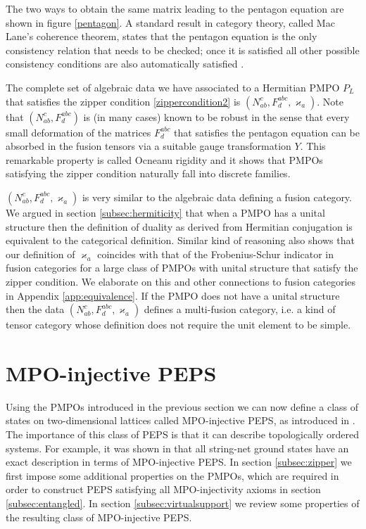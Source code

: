 \documentclass[12 pt]{article}
\begin{document}
The two ways to obtain the same matrix leading to the pentagon equation are shown in figure \ref{pentagon}. A standard result in category theory,  called Mac Lane's coherence theorem, states that the pentagon equation is the only consistency relation that needs to be checked; once it is satisfied all other possible consistency conditions are also automatically satisfied \cite{Kitaev06,maclane}.

The complete set of algebraic data we have associated to a Hermitian PMPO $P_L$ that satisfies the zipper condition \eqref{zippercondition2} is $(N_{ab}^c, F^{abc}_d, \varkappa_a)$. Note that $(N_{ab}^c, F^{abc}_d)$ is (in many cases) known to be robust in the sense that every small deformation of the matrices $F^{abc}_d$ that satisfies the pentagon equation can be absorbed in the fusion tensors via a suitable gauge transformation $Y$. This remarkable property is called Ocneanu rigidity \cite{Kitaev06,ocneanu} and it shows that PMPOs satisfying the zipper condition naturally fall into discrete families.

$(N_{ab}^c, F^{abc}_d, \varkappa_a)$ is very similar to the algebraic data defining a fusion category. We argued in section \ref{subsec:hermiticity} that when a PMPO has a unital structure then the definition of duality as derived from Hermitian conjugation is equivalent to the categorical definition.
Similar kind of reasoning also shows that our definition of $\varkappa_a$ coincides with that of the Frobenius-Schur indicator in fusion categories for a large class of PMPOs with unital structure that satisfy the zipper condition. We elaborate on this and other connections to fusion categories in Appendix \ref{app:equivalence}. If the PMPO does not have a unital structure then the data $(N_{ab}^c, F^{abc}_d, \varkappa_a)$ defines a multi-fusion category, i.e. a kind of tensor category whose definition does not require the unit element to be simple. 

\section{MPO-injective PEPS} \label{sec:MPOinjPEPS}

Using the PMPOs introduced in the previous section we can now define a class of states on two-dimensional lattices called MPO-injective PEPS, as introduced in \cite{Ginjectivity,Buerschaper14,MPOpaper}. The importance of this class of PEPS is that it can describe topologically ordered systems. For example, it was shown in \cite{MPOpaper} that all string-net ground states have an exact description in terms of MPO-injective PEPS. In section \ref{subsec:zipper} we first impose some additional properties on the PMPOs, which are required in order to construct PEPS satisfying all MPO-injectivity axioms in section \ref{subsec:entangled}. In section \ref{subsec:virtualsupport} we review some properties of the resulting class of MPO-injective PEPS.
\end{document}
